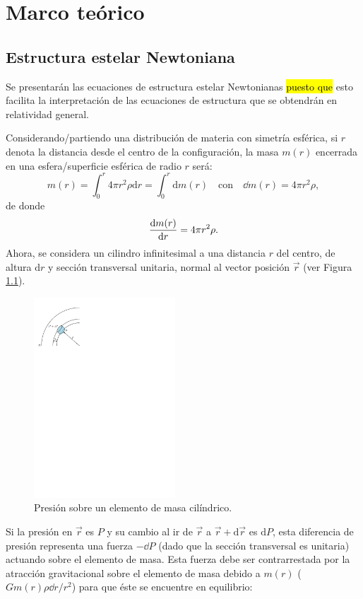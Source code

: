 \chapter{Marco teórico}
\section{Estructura estelar Newtoniana}
Se presentarán las ecuaciones de estructura estelar Newtonianas \hl{puesto que} esto facilita la interpretación de las ecuaciones de estructura que se obtendrán en relatividad general.

Considerando/partiendo una distribución de materia con simetría esférica, si $r$ denota la distancia desde el centro de la configuración, la masa $m(r)$ encerrada en una esfera/superficie esférica de radio $r$ será:  
\begin{equation}
    m ( r ) = \int _ { 0 } ^ { r } 4 \pi r ^ { 2 } \rho \mathrm{d} r = \int_{0}^{r} \mathrm{d}m(r) \quad\text{con}\quad \dd{m(r)}=4\pi r^2\rho,
\end{equation}
de donde
\begin{equation}
    \dv{m(r)}{r} =4\pi r^2 \rho.
    \label{dmnewton}
\end{equation}
Ahora, se considera un cilindro infinitesimal a una distancia $r$ del centro, de altura $\mathrm{d}r$ y sección transversal unitaria, normal al vector posición $\vec{r}$ (ver Figura \ref{stellnew}).   

\begin{figure}[H]
    \centering
    \includegraphics[width=150pt]{figures/stellarnewton.pdf}
    \caption{Presión sobre un elemento de masa cilíndrico.}
    \label{stellnew}
\end{figure}
Si la presión en $\vec{r}$ es $P$ y su cambio al ir de $\vec{r}$ a $\vec{r}+\mathrm{d}\vec{r}$ es $\mathrm{d}P$, esta diferencia de presión representa una fuerza $-\dd P$ (dado que la sección transversal es unitaria) actuando sobre el elemento de masa. Esta fuerza debe ser contrarrestada por la atracción gravitacional sobre el elemento de masa debido a $m(r)$ ($G m(r) \rho \dd r/r^2$) para que éste se encuentre en equilibrio:

